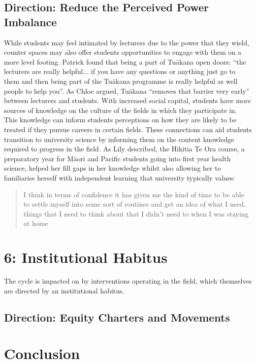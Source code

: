 \subsection{Direction: Reduce the Perceived Power Imbalance}
While students may feel intimated by lecturers due to the power that they wield, counter spaces may also offer students opportunities to engage with them on a more level footing. Patrick found that being a part of Tu\={a}kana open doors: ``the lecturers are really helpful... if you have any questions or anything just go to them and then being part of the Tu\={a}kana programme is really helpful as well people to help you''. As Chloe argued, Tu\={a}kana ``removes that barrier very early'' between lecturers and students. With increased social capital, students have more sources of knowledge on the culture of the fields in which they participate in. This knowledge can inform students perceptions on how they are likely to be treated if they pursue careers in certain fields. These connections can aid students transition to university science by informing them on the content knowledge required to progress in the field. As Lily described, the Hikitia Te Ora course, a preparatory year for M\={a}ori and Pacific students going into first year health science, helped her fill gaps in her knowledge whilst also allowing her to familiarise herself with independent learning that university typically values: \blockquote{I think in terms of confidence it has given me the kind of time to be able to settle myself into some sort of routines and get an idea of what I need, things that I need to think about that I didn't need to when I was staying at home}. 


\section{6: Institutional Habitus}
The cycle is impacted on by interventions operating in the field, which themselves are directed by an institutional habitus.


\subsection{Direction: Equity Charters and Movements}


\section{Conclusion}


